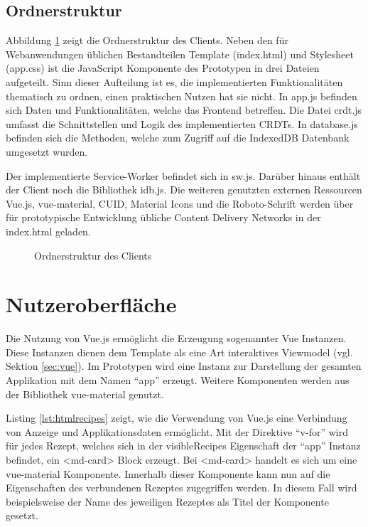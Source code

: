 \documentclass[a4paper, 12pt]{scrreprt}
\begin{document}
\subsection{Ordnerstruktur}

Abbildung \ref{fig:ordnerstruktur} zeigt die Ordnerstruktur des Clients. Neben den für Webanwendungen üblichen Bestandteilen Template (index.html) und Stylesheet (app.css) ist die JavaScript Komponente des Prototypen in drei Dateien aufgeteilt. Sinn dieser Aufteilung ist es, die implementierten Funktionalitäten thematisch zu ordnen, einen praktischen Nutzen hat sie nicht. In app.js befinden sich Daten und Funktionalitäten, welche das Frontend betreffen. Die Datei crdt.js umfasst die Schnittstellen und Logik des implementierten \acp{CRDT}. In database.js befinden sich die Methoden, welche zum Zugriff auf die IndexedDB Datenbank umgesetzt wurden. 

Der implementierte Service-Worker befindet sich in sw.js. Darüber hinaus enthält der Client noch die Bibliothek idb.js. Die weiteren genutzten externen Ressourcen Vue.js, vue-material, CUID, Material Icons und die Roboto-Schrift werden über für prototypische Entwicklung übliche Content Delivery Networks in der index.html geladen.

\begin{figure}[H]
	\centering
	\begin{minipage}{.3\textwidth}
	\end{minipage}
	\caption{Ordnerstruktur des Clients}
	\label{fig:ordnerstruktur}
\end{figure}

	
\section{Nutzeroberfläche}

Die Nutzung von Vue.js ermöglicht die Erzeugung sogenannter Vue Instanzen. Diese Instanzen dienen dem Template als eine Art interaktives Viewmodel (vgl. Sektion \ref{sec:vue}). Im Prototypen wird eine Instanz zur Darstellung der gesamten Applikation mit dem Namen \enquote{app} erzeugt. Weitere Komponenten werden aus der Bibliothek vue-material genutzt.

Listing \ref{lst:htmlrecipes} zeigt, wie die Verwendung von Vue.js eine Verbindung von Anzeige und Applikationsdaten ermöglicht. Mit der Direktive \enquote{v-for} wird für jedes Rezept, welches sich in der visibleRecipes Eigenschaft der \enquote{app} Instanz befindet, ein <md-card> Block erzeugt. Bei <md-card> handelt es sich um eine vue-material Komponente. Innerhalb dieser Komponente kann nun auf die Eigenschaften des verbundenen Rezeptes zugegriffen werden. In diesem Fall wird beispielsweise der Name des jeweiligen Rezeptes als Titel der Komponente gesetzt.
\end{document}
